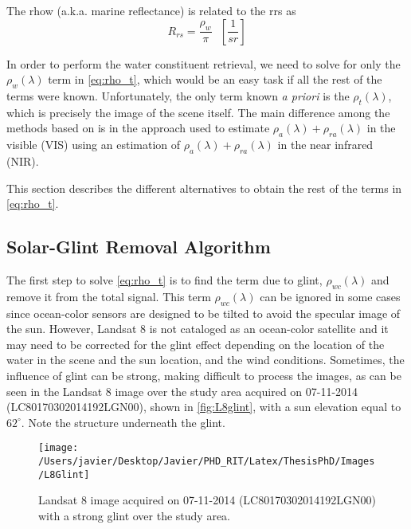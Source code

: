 The \acrfull{rhow} (a.k.a. marine reflectance) is related to the \acrfull{rrs} as
\begin{equation}\label{eq:Rrs_And_rhow}
 R_{rs} = \frac{\rho_w}{\pi}~~~\left[\frac{1}{sr}\right]
\end{equation}

In order to perform the water constituent retrieval, we need to solve for only the $\rho_w(\lambda)$ term in \autoref{eq:rho_t}, which would be an easy task if all the rest of the terms were known. Unfortunately, the only term known {\it a priori} is the $\rho_t(\lambda)$, which is precisely the image of the scene itself. The main difference among the methods based on \cite{Gordon:1994} is in the approach used to estimate $\rho_a(\lambda) + \rho_{ra}(\lambda)$ in the visible (VIS) using an estimation of $\rho_a(\lambda) + \rho_{ra}(\lambda)$ in the near infrared (NIR).

This section describes the different alternatives to obtain the rest of the terms in \autoref{eq:rho_t}.

\subsection{Solar-Glint Removal Algorithm}
\label{subsec:glintremoval}
The first step to solve \autoref{eq:rho_t} is to find the term due to glint, $\rho_{wc}(\lambda)$ and remove it from the total signal. This term $\rho_{wc}(\lambda)$ can be ignored in some cases since ocean-color sensors are designed to be tilted to avoid the specular image of the sun. However, Landsat 8 is not cataloged as an ocean-color satellite and it may need to be corrected for the glint effect depending on the location of the water in the scene and the sun location, and the wind conditions. Sometimes, the influence of glint can be strong, making difficult to process the images, as can be seen in the Landsat 8 image over the study area acquired on 07-11-2014 (LC80170302014192LGN00), shown in \autoref{fig:L8glint}, with a sun elevation equal to $62^\circ$. Note the structure underneath the glint.
\begin{figure}[htb]
  \centering
    \texttt{[image: /Users/javier/Desktop/Javier/PHD\_RIT/Latex/ThesisPhD/Images/L8Glint]}
    \caption{Landsat 8 image acquired on 07-11-2014 (LC80170302014192LGN00) with a strong glint over the study area.  \label{fig:L8glint} }
\end{figure}

